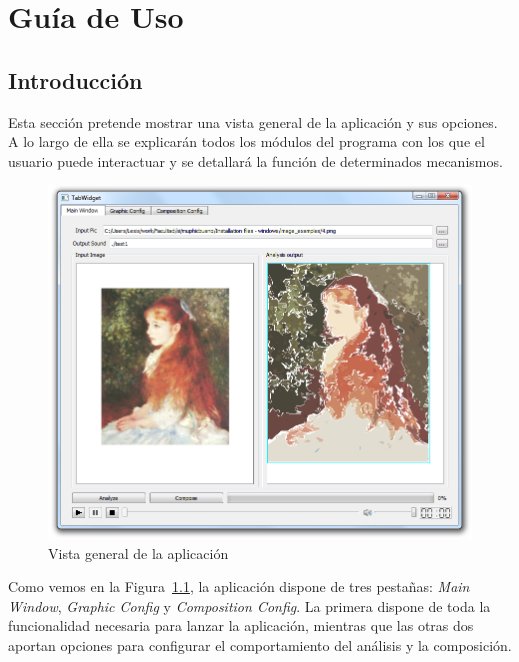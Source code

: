 \chapter{Guía de Uso}
\label{chap:guiauso}


	\section{Introducción}
		
		Esta sección pretende mostrar una vista general de la aplicación y sus opciones. A lo largo de ella se explicarán todos los módulos del programa con los que el usuario puede interactuar y se detallará la función de determinados mecanismos.\\
		
		\begin{figure}[htbp]
		\centering
		\hspace*{-0.3in}
		\includegraphics[scale=0.40]{graphics/interfazoverview.png}
		\caption{Vista general de la aplicación}
		\label{fig:interfazoverview}
		\end{figure}
		
		Como vemos en la Figura~\ref{fig:interfazoverview}, la aplicación dispone de tres pestañas: \emph{Main Window}, \emph{Graphic Config} y \emph{Composition Config}. La primera dispone de toda la funcionalidad necesaria para lanzar la aplicación, mientras que las otras dos aportan opciones para configurar el comportamiento del análisis y la composición.\\
		
